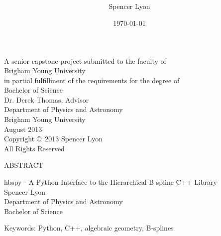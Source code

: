 \documentclass[12pt, twoside]{article}
\title{
    \vspace{-.6in}
    \usefont{OT1}{bch}{b}{n}
    \normalfont \normalsize \textsc{ } \\ [25pt]
    \horrule{0.5pt}
    \huge \thetitle \\
    \horrule{2pt}
  }
\author{
    Spencer Lyon
  }
\date{
  \normalfont \normalsize
  \today \\[-4pt] \normalsize
  }
\theoremstyle{definition} %
\numberwithin{equation}{section}
\newcommand \thetitle{hbspy -  A Python Interface to the Hierarchical B-spline C++ Library}
\begin{document}
\begin{titlepage}
  \maketitle
  \thispagestyle{empty}
  \begin{center}

  A senior capstone project submitted to the faculty of \\
  Brigham Young University\\
  in partial fulfillment of the requirements for the degree of \\[\baselineskip]
  Bachelor of Science \\ [1.5cm]

  Dr. Derek Thomas, Advisor \\ [1.5cm]

  Department of Physics and Astronomy \\[\baselineskip]
  Brigham Young University \\[\baselineskip]
  August 2013\\[2.0cm]

  Copyright \copyright\ 2013 Spencer Lyon \\[\baselineskip]

  All Rights Reserved

  \end{center}
\end{titlepage}

  \newpage
  \thispagestyle{empty}
  {\centering
  \large ABSTRACT \\ [\baselineskip]

  \normalfont \normalsize

  \thetitle \\ [\baselineskip]

  Spencer Lyon\\
  Department of Physics and Astronomy\\
  Bachelor of Science \\ [\baselineskip]
  }

  

  \vfill
  \noindent Keywords: Python, C++, algebraic geometry, B-splines

  \newpage
  \tableofcontents

\newpage
{}  %
\setcounter{page}{1}  %
\thispagestyle{empty}
\pagestyle{mainDoc}
\end{document}
